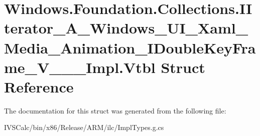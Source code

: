 \hypertarget{struct_windows_1_1_foundation_1_1_collections_1_1_i_iterator___a___windows___u_i___xaml___media_189c5f43d313ec4f49b63f95aaeed2d5}{}\section{Windows.\+Foundation.\+Collections.\+I\+Iterator\+\_\+\+A\+\_\+\+Windows\+\_\+\+U\+I\+\_\+\+Xaml\+\_\+\+Media\+\_\+\+Animation\+\_\+\+I\+Double\+Key\+Frame\+\_\+\+V\+\_\+\+\_\+\+\_\+\+Impl.\+Vtbl Struct Reference}
\label{struct_windows_1_1_foundation_1_1_collections_1_1_i_iterator___a___windows___u_i___xaml___media_189c5f43d313ec4f49b63f95aaeed2d5}


The documentation for this struct was generated from the following file\+:\begin{DoxyCompactItemize}
\item 
I\+V\+S\+Calc/bin/x86/\+Release/\+A\+R\+M/ilc/Impl\+Types.\+g.\+cs\end{DoxyCompactItemize}
